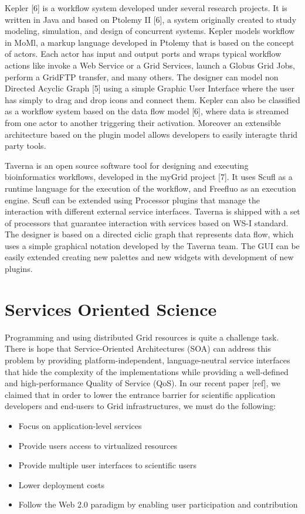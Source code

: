 \documentclass[conference]{IEEEtran}
\begin{document}
Kepler [6] is a workflow system developed under several research projects.
It is written in Java and based on Ptolemy II [6], a system originally
created to study modeling, simulation, and design of concurrent systems.
Kepler models workflow in MoMl, a markup language developed in Ptolemy that
is based on the concept of actors. Each actor has input and output ports
and wraps typical workflow actions like invoke a Web Service or a Grid
Services, launch a Globus Grid Jobs, perform a GridFTP transfer, and many
others. The designer can model non Directed Acyclic Graph [5] using a
simple Graphic User Interface where the user has simply to drag and drop
icons and connect them.  Kepler can also be classified as a workflow system
based on the data flow model [6], where data is streamed from one actor to
another triggering their activation. Moreover an extensible architecture
based on the plugin model allows developers to easily interagte thrid party
tools.

Taverna is an open source software tool for designing and executing
bioinformatics workflows, developed in the myGrid project [7]. It uses
Scufl as a runtime language for the execution of the workflow, and Freefluo
as an execution engine. Scufl can be extended using Processor plugins that
manage the interaction with different external service interfaces. Taverna
is shipped with a set of processors that guarantee interaction with
services based on WS-I standard. The designer is based on a directed ciclic
graph that represents data flow, which uses a simple graphical notation
developed by the Taverna team. The GUI can be easily extended creating new
palettes and new widgets with development of new plugins.

\section {Services Oriented Science}

Programming and using distributed Grid resources is quite a challenge task.
There is hope that Service-Oriented Architectures (SOA) can address this
problem by providing platform-independent, language-neutral service
interfaces that hide the complexity of the implementations while providing
a well-defined and high-performance Quality of Service (QoS). In our recent
paper [ref], we claimed that in order to lower the entrance barrier for
scientific application developers and end-users to Grid infrastructures, we
must do the following: 

\begin{itemize}
\item{Focus on application-level services}
\item{Provide users access to virtualized resources}
\item{Provide multiple user interfaces to scientific users}
\item{Lower deployment costs}
\item{Follow the Web 2.0 paradigm by enabling user participation and contribution}
\end{itemize}
\end{document}
